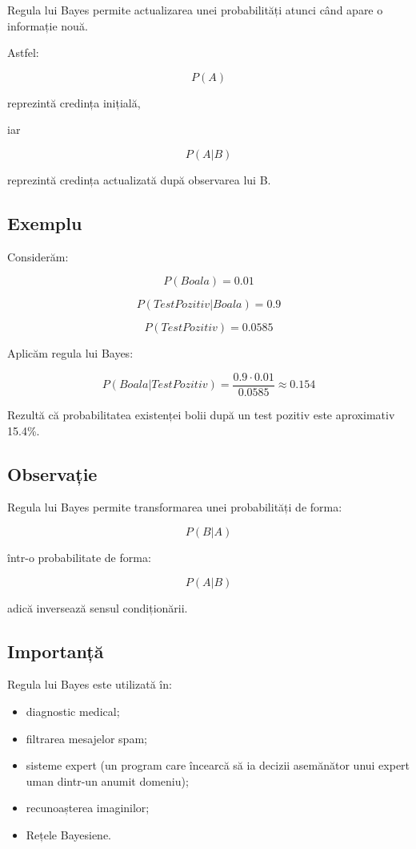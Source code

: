 \documentclass[12pt,a4paper]{article}
\begin{document}
Regula lui Bayes permite actualizarea unei probabilități atunci când apare o informație nouă.

Astfel:

\[
P(A)
\]

reprezintă credința inițială,

iar

\[
P(A|B)
\]

reprezintă credința actualizată după observarea lui B.

\subsection{Exemplu}

Considerăm:

\[
P(Boala)=0.01
\]

\[
P(TestPozitiv|Boala)=0.9
\]

\[
P(TestPozitiv)=0.0585
\]

Aplicăm regula lui Bayes:

\[
P(Boala|TestPozitiv)
=
\frac
{0.9 \cdot 0.01}
{0.0585}
\approx 0.154
\]

Rezultă că probabilitatea existenței bolii după un test pozitiv este aproximativ 15.4\%.

\subsection{Observație}

Regula lui Bayes permite transformarea unei probabilități de forma:

\[
P(B|A)
\]

într-o probabilitate de forma:

\[
P(A|B)
\]

adică inversează sensul condiționării.

\subsection{Importanță}

Regula lui Bayes este utilizată în:

\begin{itemize}
\item diagnostic medical;
\item filtrarea mesajelor spam;
\item sisteme expert (un program care încearcă să ia decizii asemănător unui expert uman dintr-un anumit domeniu);
\item recunoașterea imaginilor;
\item Rețele Bayesiene.
\end{itemize}
\end{document}
